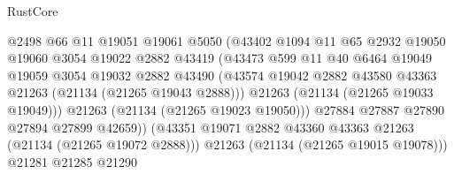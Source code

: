 \begin{lexlean}{RustCore}
\begin{coremodule}
                                    @2498
                                    @66
                                    @11
                                    @19051
                                    @19061
                                    @5050
                                    (@43402
                                      @1094
                                      @11
                                      @65
                                      @2932
                                      @19050
                                      @19060
                                      @3054
                                      @19022
                                      @2882
                                      @43419
                                      (@43473
                                        @599
                                        @11
                                        @40
                                        @6464
                                        @19049
                                        @19059
                                        @3054
                                        @19032
                                        @2882
                                        @43490
                                        (@43574
                                          @19042
                                          @2882
                                          @43580
                                          @43363
                                          @21263
                                          (@21134 (@21265 @19043 @2888)))
                                        @21263
                                        (@21134 (@21265 @19033 @19049)))
                                      @21263
                                      (@21134 (@21265 @19023 @19050)))
                                    @27884
                                    @27887
                                    @27890
                                    @27894
                                    @27899
                                    @42659))
                                (@43351
                                  @19071
                                  @2882
                                  @43360
                                  @43363
                                  @21263
                                  (@21134 (@21265 @19072 @2888)))
                                @21263
                                (@21134 (@21265 @19015 @19078)))
                              @21281
                              @21285
                              @21290

\end{coremodule}
\end{lexlean}
